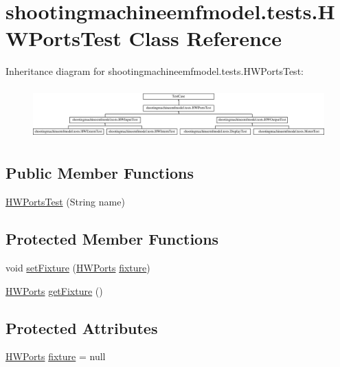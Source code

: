 \hypertarget{classshootingmachineemfmodel_1_1tests_1_1_h_w_ports_test}{\section{shootingmachineemfmodel.\-tests.\-H\-W\-Ports\-Test Class Reference}
\label{classshootingmachineemfmodel_1_1tests_1_1_h_w_ports_test}
}
Inheritance diagram for shootingmachineemfmodel.\-tests.\-H\-W\-Ports\-Test\-:\begin{figure}[H]
\begin{center}
\leavevmode
\includegraphics[height=2.000000cm]{classshootingmachineemfmodel_1_1tests_1_1_h_w_ports_test}
\end{center}
\end{figure}
\subsection*{Public Member Functions}
\begin{DoxyCompactItemize}
\item 
\hyperlink{classshootingmachineemfmodel_1_1tests_1_1_h_w_ports_test_a3c329b827a2523b726946b501ef90ee1}{H\-W\-Ports\-Test} (String name)
\end{DoxyCompactItemize}
\subsection*{Protected Member Functions}
\begin{DoxyCompactItemize}
\item 
void \hyperlink{classshootingmachineemfmodel_1_1tests_1_1_h_w_ports_test_a51beefc9b8e86cae5d017ff816ec3d90}{set\-Fixture} (\hyperlink{interfaceshootingmachineemfmodel_1_1_h_w_ports}{H\-W\-Ports} \hyperlink{classshootingmachineemfmodel_1_1tests_1_1_h_w_ports_test_a5ff60cd0b494531ccb90644599c0a8de}{fixture})
\item 
\hyperlink{interfaceshootingmachineemfmodel_1_1_h_w_ports}{H\-W\-Ports} \hyperlink{classshootingmachineemfmodel_1_1tests_1_1_h_w_ports_test_abf0c0be966493158fa131bfe05ea7858}{get\-Fixture} ()
\end{DoxyCompactItemize}
\subsection*{Protected Attributes}
\begin{DoxyCompactItemize}
\item 
\hyperlink{interfaceshootingmachineemfmodel_1_1_h_w_ports}{H\-W\-Ports} \hyperlink{classshootingmachineemfmodel_1_1tests_1_1_h_w_ports_test_a5ff60cd0b494531ccb90644599c0a8de}{fixture} = null
\end{DoxyCompactItemize}



